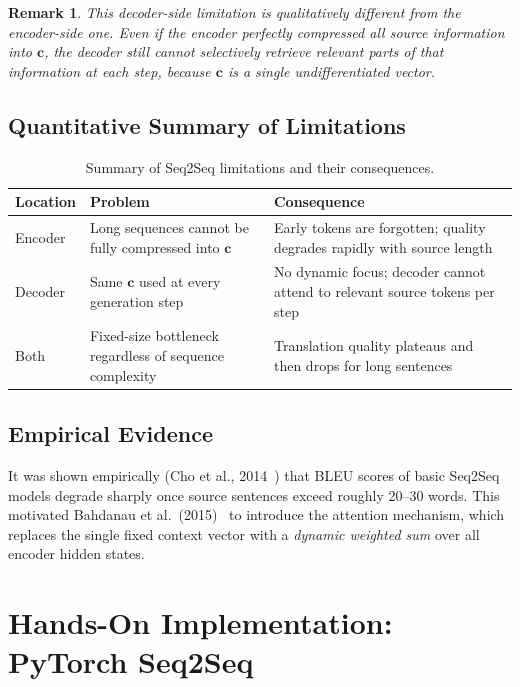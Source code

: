 \documentclass[12pt,a4paper]{article}
\newtheorem{remark}{Remark}[section]
\begin{document}
\begin{remark}
  This decoder-side limitation is qualitatively different from the encoder-side one. Even if the
  encoder perfectly compressed all source information into $\mathbf{c}$, the decoder still cannot
  selectively retrieve \emph{relevant} parts of that information at each step, because
  $\mathbf{c}$ is a single undifferentiated vector.
\end{remark}

\subsection{Quantitative Summary of Limitations}

\begin{table}[htbp]
  \centering
  \caption{Summary of Seq2Seq limitations and their consequences.}
  \label{tab:limitations}
  \begin{tabular}{@{}p{3cm}p{5.5cm}p{5cm}@{}}
    \toprule
    \textbf{Location} & \textbf{Problem} & \textbf{Consequence} \\
    \midrule
    Encoder & Long sequences cannot be fully compressed into $\mathbf{c}$ & Early tokens are forgotten; quality degrades rapidly with source length \\
    \midrule
    Decoder & Same $\mathbf{c}$ used at every generation step & No dynamic focus; decoder cannot attend to relevant source tokens per step \\
    \midrule
    Both & Fixed-size bottleneck regardless of sequence complexity & Translation quality plateaus and then drops for long sentences \\
    \bottomrule
  \end{tabular}
\end{table}

\subsection{Empirical Evidence}

It was shown empirically (Cho et al., 2014~\cite{cho2014}) that BLEU scores of basic Seq2Seq
models degrade sharply once source sentences exceed roughly 20--30 words. This motivated
Bahdanau et al.\ (2015)~\cite{bahdanau2015} to introduce the attention mechanism, which
replaces the single fixed context vector with a \emph{dynamic weighted sum} over all encoder
hidden states.

\section{Hands-On Implementation: PyTorch Seq2Seq}
\label{sec:implementation}
\end{document}
